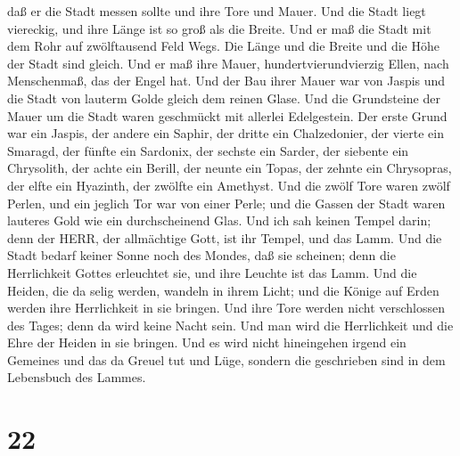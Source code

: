 daß er die Stadt messen sollte und ihre Tore und Mauer. 
Und die Stadt liegt viereckig, und ihre Länge ist so groß als die
Breite. Und er maß die Stadt mit dem Rohr auf zwölftausend Feld Wegs.
Die Länge und die Breite und die Höhe der Stadt sind gleich.
 Und er maß ihre Mauer, hundertvierundvierzig Ellen, nach
Menschenmaß, das der Engel hat.  Und der Bau ihrer Mauer
war von Jaspis und die Stadt von lauterm Golde gleich dem reinen Glase.
 Und die Grundsteine der Mauer um die Stadt waren
geschmückt mit allerlei Edelgestein. Der erste Grund war ein Jaspis, der
andere ein Saphir, der dritte ein Chalzedonier, der vierte ein Smaragd,
 der fünfte ein Sardonix, der sechste ein Sarder, der
siebente ein Chrysolith, der achte ein Berill, der neunte ein Topas, der
zehnte ein Chrysopras, der elfte ein Hyazinth, der zwölfte ein Amethyst.
 Und die zwölf Tore waren zwölf Perlen, und ein jeglich Tor
war von einer Perle; und die Gassen der Stadt waren lauteres Gold wie
ein durchscheinend Glas.  Und ich sah keinen Tempel darin;
denn der HERR, der allmächtige Gott, ist ihr Tempel, und das Lamm.
 Und die Stadt bedarf keiner Sonne noch des Mondes, daß sie
scheinen; denn die Herrlichkeit Gottes erleuchtet sie, und ihre Leuchte
ist das Lamm.  Und die Heiden, die da selig werden, wandeln
in ihrem Licht; und die Könige auf Erden werden ihre Herrlichkeit in sie
bringen.  Und ihre Tore werden nicht verschlossen des
Tages; denn da wird keine Nacht sein.  Und man wird die
Herrlichkeit und die Ehre der Heiden in sie bringen.  Und
es wird nicht hineingehen irgend ein Gemeines und das da Greuel tut und
Lüge, sondern die geschrieben sind in dem Lebensbuch des Lammes.

\hypertarget{section-21}{%
\section{22}\label{section-21}}

